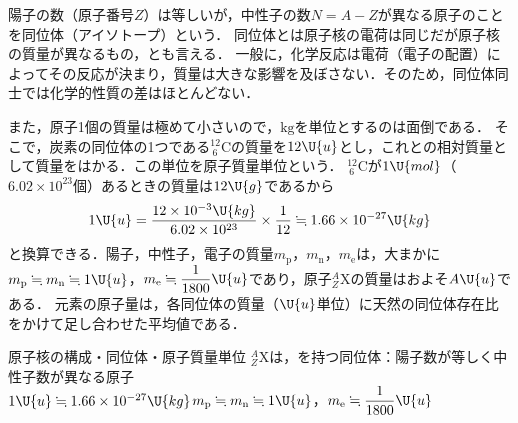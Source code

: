 陽子の数（原子番号$Z$）は等しいが，中性子の数$N=A-Z$が異なる原子のことを{\gtfamily 同位体}（アイソトープ）という．
同位体とは原子核の電荷は同じだが原子核の質量が異なるもの，とも言える．
一般に，化学反応は電荷（電子の配置）によってその反応が決まり，質量は大きな影響を及ぼさない．そのため，同位体同士では化学的性質の差はほとんどない．

また，原子1個の質量は極めて小さいので，$\mathrm{kg}$を単位とするのは面倒である．
そこで，炭素の同位体の1つである${}^{12}_{\ 6}\mathrm{C}$の質量を$12\U{u}$とし，これとの相対質量として質量をはかる．この単位を{\gtfamily 原子質量単位}という．
${}^{12}_{\ 6}\mathrm{C}$が$1\U{mol}$（$6.02\times 10^{23}$個）あるときの質量は$12\U{g}$であるから
\[1\U{u}=\frac{12\times 10^{-3}\U{kg}}{6.02\times 10^{23}}\times\frac{1}{12}\fallingdotseq 1.66\times 10^{-27}\U{kg}\]
と換算できる．陽子，中性子，電子の質量$m_{\mathrm{p}}$，$m_{\mathrm{n}}$，$m_{\mathrm{e}}$は，大まかに$m_{\mathrm{p}}\fallingdotseq m_{\mathrm{n}}\fallingdotseq 1\U{u}$，$m_{\mathrm{e}}\fallingdotseq\dfrac{1}{1800}\U{u}$であり，原子${}^A_Z\mathrm{X}$の質量はおよそ$A\U{u}$である．
元素の原子量は，各同位体の質量（$\U{u}$単位）に天然の同位体存在比をかけて足し合わせた平均値である．

\bsNeed{30mm}
\begin{matome}{原子核の構成・同位体・原子質量単位}
 \hspace{3mm} ${}^A_Z\mathrm{X}$は，を持つ\qquad 同位体：陽子数が等しく中性子数が異なる原子\\
 \hspace{3mm} $1\U{u}\fallingdotseq 1.66\times 10^{-27}\U{kg}$\qquad $m_{\mathrm{p}}\fallingdotseq m_{\mathrm{n}}\fallingdotseq 1\U{u}$，$m_{\mathrm{e}}\fallingdotseq\dfrac{1}{1800}\U{u}$
\end{matome}

